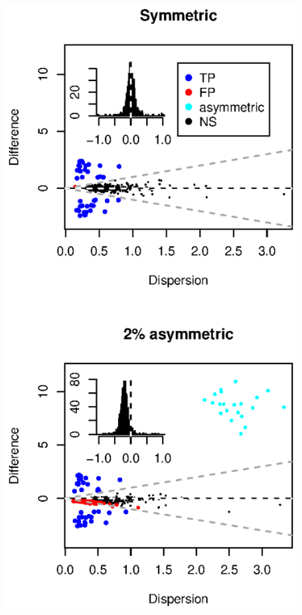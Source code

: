 \documentclass[graybox]{svmult}
\begin{document}
%
\begin{figure}[b]
\sidecaption[t]
\includegraphics[scale=.65]{Fig_1-book.eps}

\end{figure}
\end{document}
